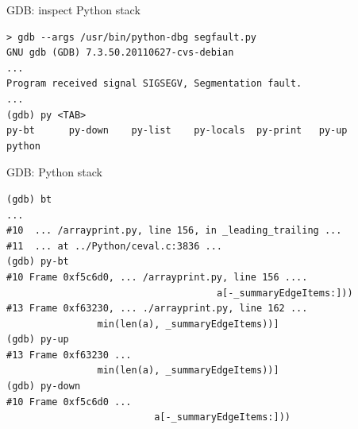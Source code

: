 \documentclass[]{beamer}
\begin{document}
\begin{frame}[fragile]{GDB: inspect Python stack}
\begin{verbatim}
> gdb --args /usr/bin/python-dbg segfault.py
GNU gdb (GDB) 7.3.50.20110627-cvs-debian
...
Program received signal SIGSEGV, Segmentation fault.
...
(gdb) py <TAB>
py-bt      py-down    py-list    py-locals  py-print   py-up      python
\end{verbatim}
\end{frame}

\begin{frame}[fragile]{GDB: Python stack}
\begin{verbatim}
(gdb) bt
...
#10  ... /arrayprint.py, line 156, in _leading_trailing ...
#11  ... at ../Python/ceval.c:3836 ...
(gdb) py-bt
#10 Frame 0xf5c6d0, ... /arrayprint.py, line 156 ....
                                     a[-_summaryEdgeItems:]))
#13 Frame 0xf63230, ... ./arrayprint.py, line 162 ...
                min(len(a), _summaryEdgeItems))]
(gdb) py-up
#13 Frame 0xf63230 ...
                min(len(a), _summaryEdgeItems))]
(gdb) py-down
#10 Frame 0xf5c6d0 ...
                          a[-_summaryEdgeItems:]))
\end{verbatim}
\end{frame}

\end{document}
